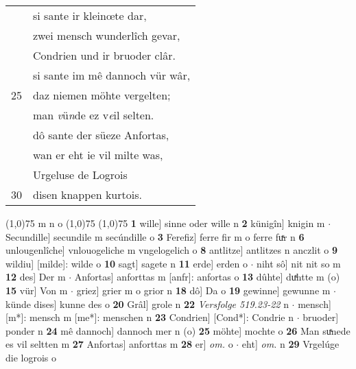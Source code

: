\documentclass[8pt,a4paper,notitlepage]{article}
\begin{document}
\begin{table}[ht]
\begin{minipage}[t]{0.5\linewidth}
\begin{tabular}{rl}
 & si sante ir kleinœte dar,\\ 
 & zwei mensch wunderlîch gevar,\\ 
 & Condrien und ir bruoder clâr.\\ 
 & si sante im mê dannoch vür wâr,\\ 
25 & daz niemen möhte vergelten;\\ 
 & man \textit{v}ü\textit{n}de ez v\textit{e}il selten.\\ 
 & dô sante der süeze Anfortas,\\ 
 & wan er eht ie vil milte was,\\ 
 & Urgeluse de Logrois\\ 
30 & disen knappen kurtois.\\ 
\end{tabular}
\scriptsize
\line(1,0){75} \newline
m n o \newline
\line(1,0){75} \newline
\newline
\line(1,0){75} \newline
\textbf{1} wille] sinne oder wille n \textbf{2} künigîn] knigin m  $\cdot$ Secundille] secundile m secúndille o \textbf{3} Ferefiz] ferre fir m o ferre fuͯr n \textbf{6} unlougenlîche] vnlouogeliche m vngelogelich o \textbf{8} antlitze] antlitzes n anczlit o \textbf{9} wildiu] [milde]: wilde o \textbf{10} sagt] sagete n \textbf{11} erde] erden o  $\cdot$ niht sô] nit nit so m \textbf{12} des] Der m  $\cdot$ Anfortas] anforttas m [anfr]: anfortas o \textbf{13} dûhte] duͯhtte m (o) \textbf{15} vür] Von m  $\cdot$ griez] grier m o grior n \textbf{18} dô] Da o \textbf{19} gewinne] gewunne m  $\cdot$ künde dises] kunne des o \textbf{20} Grâl] grole n \textbf{22} \textit{Versfolge 519.23-22} n   $\cdot$ mensch] [m*]: mensch m [me*]: menschen n \textbf{23} Condrien] [Cond*]: Condrie n  $\cdot$ bruoder] ponder n \textbf{24} mê dannoch] dannoch mer n (o) \textbf{25} möhte] mochte o \textbf{26} Man suͯnede es vil seltten m \textbf{27} Anfortas] anforttas m \textbf{28} er] \textit{om.} o  $\cdot$ eht] \textit{om.} n \textbf{29} Vrgelúge die logrois o \newline
\end{minipage}
\end{table}
\newpage
\end{document}
